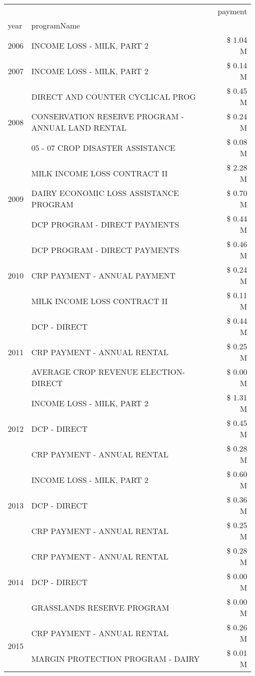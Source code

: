 \begin{tabular}{llr}
\toprule
 &  & payment \\
year & programName &  \\
\midrule
2006 & INCOME LOSS - MILK, PART 2 & \$ 1.04 M \\
\cline{1-3}
2007 & INCOME LOSS - MILK, PART 2 & \$ 0.14 M \\
\cline{1-3}
\multirow[t]{3}{*}{2008} & DIRECT AND COUNTER CYCLICAL PROG & \$ 0.45 M \\
 & CONSERVATION RESERVE PROGRAM - ANNUAL LAND RENTAL & \$ 0.24 M \\
 & 05 - 07 CROP DISASTER ASSISTANCE & \$ 0.08 M \\
\cline{1-3}
\multirow[t]{3}{*}{2009} & MILK INCOME LOSS CONTRACT II & \$ 2.28 M \\
 & DAIRY ECONOMIC LOSS ASSISTANCE PROGRAM & \$ 0.70 M \\
 & DCP PROGRAM - DIRECT PAYMENTS & \$ 0.44 M \\
\cline{1-3}
\multirow[t]{3}{*}{2010} & DCP PROGRAM - DIRECT PAYMENTS & \$ 0.46 M \\
 & CRP PAYMENT - ANNUAL PAYMENT & \$ 0.24 M \\
 & MILK INCOME LOSS CONTRACT II & \$ 0.11 M \\
\cline{1-3}
\multirow[t]{3}{*}{2011} & DCP - DIRECT & \$ 0.44 M \\
 & CRP PAYMENT - ANNUAL RENTAL & \$ 0.25 M \\
 & AVERAGE CROP REVENUE ELECTION-DIRECT & \$ 0.00 M \\
\cline{1-3}
\multirow[t]{3}{*}{2012} & INCOME LOSS - MILK, PART 2 & \$ 1.31 M \\
 & DCP - DIRECT & \$ 0.45 M \\
 & CRP PAYMENT - ANNUAL RENTAL & \$ 0.28 M \\
\cline{1-3}
\multirow[t]{3}{*}{2013} & INCOME LOSS - MILK, PART 2 & \$ 0.60 M \\
 & DCP - DIRECT & \$ 0.36 M \\
 & CRP PAYMENT - ANNUAL RENTAL & \$ 0.25 M \\
\cline{1-3}
\multirow[t]{3}{*}{2014} & CRP PAYMENT - ANNUAL RENTAL & \$ 0.28 M \\
 & DCP - DIRECT & \$ 0.00 M \\
 & GRASSLANDS RESERVE PROGRAM & \$ 0.00 M \\
\cline{1-3}
\multirow[t]{3}{*}{2015} & CRP PAYMENT - ANNUAL RENTAL & \$ 0.26 M \\
 & MARGIN PROTECTION PROGRAM - DAIRY & \$ 0.01 M \\

\end{tabular}
